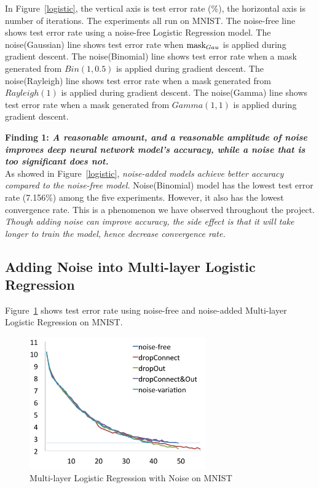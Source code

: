 In Figure~\ref{logistic}, the vertical axis is test error rate (\%), the
horizontal axis is number of iterations. The experiments all run on MNIST.
The noise-free line shows test error rate using a noise-free Logistic
Regression model.
The noise(Gaussian) line shows test error rate when $\text{mask}_{Gau}$ is applied during gradient descent.
The noise(Binomial) line shows test error rate when a mask generated from
$Bin(1,0.5)$ is applied during gradient descent.
The noise(Rayleigh) line shows test error rate when a mask generated from
$Rayleigh(1)$ is applied during gradient descent.
The noise(Gamma) line shows test error rate when a mask generated from
$Gamma(1,1)$ is applied during gradient descent.

{\bf Finding 1: {\em A reasonable amount, and a reasonable amplitude of noise
improves deep neural network model's accuracy, while a noise that is too
significant does not.}} \\
As showed in Figure~\ref{logistic}, {\em noise-added models achieve better
accuracy compared to the noise-free model.}
Noise(Binomial) model has the lowest test error rate (7.156\%) among the
five experiments. However, it also has the lowest convergence rate.
This is a phenomenon we have observed throughout the project.
{\em Though adding noise can improve accuracy, the side effect is that it
will take longer to train the model, hence decrease convergence rate.}

\subsection{Adding Noise into Multi-layer Logistic Regression}
Figure~\ref{mlp} shows test error rate using noise-free and noise-added
Multi-layer Logistic Regression on MNIST.
\begin{figure}[!htbp]
\centering
\includegraphics[width=215pt]{f-figs/mlp.png}
\caption{Multi-layer Logistic Regression with Noise on MNIST}
\label{mlp}
\end{figure}

